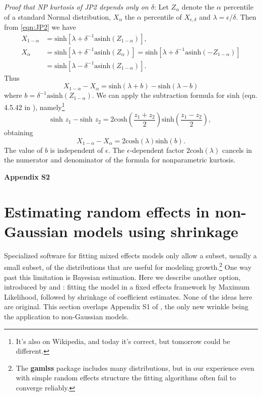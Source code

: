 \documentclass[12pt]{article}
\newcommand{\be}{\begin{equation}}
\newcommand{\ee}{\end{equation}}
\begin{document}
\begin{spacing}{1.35}
	\emph{Proof that NP kurtosis of JP2 depends only on $\delta$}: 
	Let $Z_\alpha$ denote the $\alpha$ percentile of a standard
	Normal distribution, $X_\alpha$ the $\alpha$ percentile of $X_{\epsilon, \delta}$ and 
	$\lambda =  \epsilon/\delta$. Then from \eqref{eqn:JP2}
	we have 
	\be
	\begin{aligned}
		X_{1-\alpha} & = \mbox{sinh} \left[ \lambda  + \delta^{-1} \mbox{asinh}(Z_{1-\alpha}) \right] ,  \\
		X_{\alpha} & = \mbox{sinh} \left[ \lambda  + \delta^{-1} \mbox{asinh}(Z_{\alpha}) \right]
		= \mbox{sinh} \left[ \lambda + \delta^{-1} \mbox{asinh}(-Z_{1-\alpha}) \right] \\
		& = \mbox{sinh} \left[ \lambda - \delta^{-1} \mbox{asinh}(Z_{1-\alpha}) \right]. 
	\end{aligned}
	\ee
	Thus  
	\be
	X_{1-\alpha} - X_{\alpha} = \mbox{sinh}(\lambda + b) - \mbox{sinh}(\lambda - b)
	\ee
	where $b = \delta^{-1}\mbox{asinh}(Z_{1-\alpha})$. We can apply the subtraction formula for sinh (eqn. 4.5.42
	in \citet{abram-steg}), namely\footnote{It's also on Wikipedia, and today it's correct, but tomorrow could
		be different.}
	\be 
	\mbox{sinh } z_1 - \mbox{sinh } z_2  = 2 \mbox{cosh}\left( \frac{z_1 + z_2}{2}\right) \mbox{sinh}\left( \frac{z_1 - z_2}{2}\right), 
	\ee  
	obtaining 
	\be
	X_{1-\alpha} - X_{\alpha} =  2 \mbox{cosh}(\lambda) \mbox{sinh}(b).
	\ee  
	The value of $b$ is independent of $\epsilon$. The $\epsilon$-dependent factor $2 \mbox{cosh}(\lambda)$ 
	cancels in the numerator and denominator of the formula for nonparametric kurtosis. \scalebox{1.25}{$\square$}
	
	\newpage
	\linenumbers
	\centerline{\Large{\textbf{Appendix S2}}}
	\renewcommand{\thetable}{S-\arabic{table}}
	\renewcommand{\thefigure}{S-\arabic{figure}}
	\renewcommand{\thesection}{S.\arabic{section}}
	\renewcommand{\theequation}{S\arabic{equation}}
	\setcounter{page}{1}
	\setcounter{equation}{0}
	\setcounter{figure}{0}
	\setcounter{section}{0}
	\setcounter{table}{0}
	\section{Estimating random effects in non-Gaussian models using shrinkage}
	Specialized software for fitting mixed effects models only allow a subset, usually a small subset, of the distributions that 
	are useful for modeling growth.\footnote{The \textbf{gamlss} package includes many distributions, but in our experience even with 
		simple random effects structure the fitting algorithms often fail to converge reliably.} One way past this limitation is Bayesian estimation. Here we describe another option, 
	introduced by \citet{link-nichols-1994} and \citet{gould-nichols-1998}: 
	fitting the model in a fixed effects framework by Maximum Likelihood, followed by shrinkage of coefficient estimates. 
	None of the ideas here are original. This section overlaps Appendix S1 of \citet{metcalf-etal-2015}, the only new wrinkle
	being the application to non-Gaussian models.
	

\end{spacing}
\end{document}
